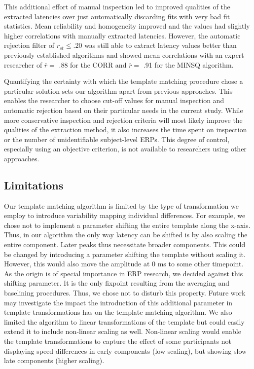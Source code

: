 \documentclass[
  man]{apa7}
\begin{document}
This additional effort of manual inspection led to improved qualities of the extracted latencies over just automatically discarding fits with very bad fit statistics. Mean reliability and homogeneity improved and the values had slightly higher correlations with manually extracted latencies. However, the automatic rejection filter of \(r_{st} \le .20\) was still able to extract latency values better than previously established algorithms and showed mean correlations with an expert researcher of \(\overline{r} =\) .88 for the CORR and \(\overline{r} =\) .91 for the MINSQ algorithm.

Quantifying the certainty with which the template matching procedure chose a particular solution sets our algorithm apart from previous approaches. This enables the researcher to choose cut-off values for manual inspection and automatic rejection based on their particular needs in the current study. While more conservative inspection and rejection criteria will most likely improve the qualities of the extraction method, it also increases the time spent on inspection or the number of unidentifiable subject-level ERPs. This degree of control, especially using an objective criterion, is not available to researchers using other approaches.

\hypertarget{limitations}{%
\subsection{Limitations}\label{limitations}}

Our template matching algorithm is limited by the type of transformation we employ to introduce variability mapping individual differences. For example, we chose not to implement a parameter shifting the entire template along the x-axis. Thus, in our algorithm the only way latency can be shifted is by also scaling the entire component. Later peaks thus necessitate broader components. This could be changed by introducing a parameter shifting the template without scaling it. However, this would also move the amplitude at 0 ms to some other timepoint. As the origin is of special importance in ERP research, we decided against this shifting parameter. It is the only fixpoint resulting from the averaging and baselining procedures. Thus, we chose not to disturb this property. Future work may investigate the impact the introduction of this additional parameter in template transformations has on the template matching algorithm. We also limited the algorithm to linear transformations of the template but could easily extend it to include non-linear scaling as well. Non-linear scaling would enable the template transformations to capture the effect of some participants not displaying speed differences in early components (low scaling), but showing slow late components (higher scaling).
\end{document}

